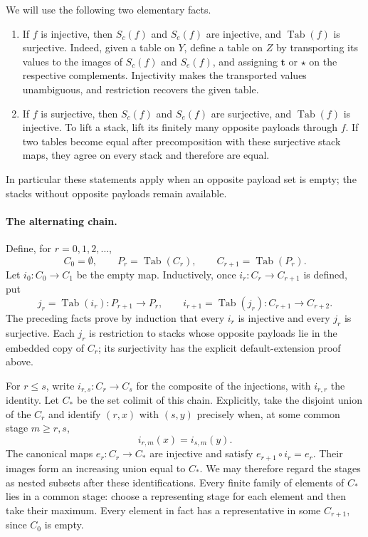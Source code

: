 We will use the following two elementary facts.
\begin{enumerate}
\item If $f$ is injective, then $S_c(f)$ and $S_e(f)$ are injective,
and $\operatorname{Tab}(f)$ is surjective.  Indeed, given a table on
$Y$, define a table on $Z$ by transporting its values to the images
of $S_c(f)$ and $S_e(f)$, and assigning $\mathbf t$ or $\star$ on the
respective complements.  Injectivity makes the transported values
unambiguous, and restriction recovers the given table.
\item If $f$ is surjective, then $S_c(f)$ and $S_e(f)$ are surjective,
and $\operatorname{Tab}(f)$ is injective.  To lift a stack, lift its
finitely many opposite payloads through $f$.  If two tables become
equal after precomposition with these surjective stack maps, they
agree on every stack and therefore are equal.
\end{enumerate}
In particular these statements apply when an opposite payload set is
empty; the stacks without opposite payloads remain available.

\paragraph{The alternating chain.}
Define, for $r=0,1,2,\ldots$,
\begin{equation}
  C_0=\emptyset,
  \qquad P_r=\operatorname{Tab}(C_r),
  \qquad C_{r+1}=\operatorname{Tab}(P_r).
  \label{obs:free-stages}
\end{equation}
Let $i_0:C_0\to C_1$ be the empty map.  Inductively, once
$i_r:C_r\to C_{r+1}$ is defined, put
\begin{equation}
  j_r=\operatorname{Tab}(i_r):P_{r+1}\longrightarrow P_r,
  \qquad
  i_{r+1}=\operatorname{Tab}(j_r):C_{r+1}\longrightarrow C_{r+2}.
  \label{obs:free-bonding}
\end{equation}
The preceding facts prove by induction that every $i_r$ is injective
and every $j_r$ is surjective.  Each $j_r$ is restriction to stacks
whose opposite payloads lie in the embedded copy of $C_r$; its
surjectivity has the explicit default-extension proof above.

For $r\leq s$, write $i_{r,s}:C_r\to C_s$ for the composite of the
injections, with $i_{r,r}$ the identity.  Let $C_*$ be the set colimit
of this chain.  Explicitly, take the disjoint union of the $C_r$ and
identify $(r,x)$ with $(s,y)$ precisely when, at some common stage
$m\geq r,s$,
\[
  i_{r,m}(x)=i_{s,m}(y).
\]
The canonical maps $e_r:C_r\to C_*$ are injective and satisfy
$e_{r+1}\circ i_r=e_r$.  Their images form an increasing union
equal to $C_*$.  We may therefore regard the stages as nested
subsets after these identifications.  Every finite family of elements
of $C_*$ lies in a common stage: choose a representing stage for
each element and then take their maximum.  Every element in fact
has a representative in some $C_{r+1}$, since $C_0$ is empty.

